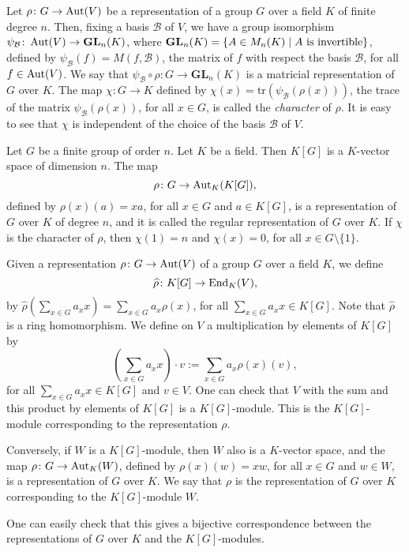 Let $\rho\colon G\rightarrow\operatorname{Aut}(V)$ be a representation of a group $G$ over a field $K$ of finite degree $n$. 
Then, fixing a basis $\mathcal{B}$ of $V$, we have a group isomorphism $\psi_{\mathcal{B}}\colon \operatorname{Aut}(V)\rightarrow \mathbf{GL}_n(K)$, where $\mathbf{GL}_n(K)=\{ A\in M_n(K)\mid A\mbox{ is invertible}\}$, defined by $\psi_{\mathcal{B}}(f)=M(f,\mathcal{B})$, the matrix
of $f$ with respect the basis $\mathcal{B}$, for all $f\in \operatorname{Aut}(V)$. We say that $\psi_{\mathcal{B}}\circ \rho\colon G\rightarrow \mathbf{GL}_n(K)$ is a matricial representation of $G$ over $K$. The map $\chi\colon G\rightarrow K$ defined by 
$\chi(x)=\mathrm{tr}(\psi_{\mathcal{B}}( \rho(x)))$, the trace of the matrix $\psi_{\mathcal{B}}( \rho(x))$, for all $x\in G$, is called 
the {\em character} of $\rho$. It is easy to see that $\chi$ is independent of the choice of the basis $\mathcal{B}$ of $V$.

\begin{example}
Let $G$ be a finite group of order $n$. Let $K$ be a field. Then $K[G]$ is a $K$-vector space of dimension $n$. The map
\[ \rho\colon G\rightarrow \operatorname{Aut}_K(K[G]),\]
defined by $\rho(x)(a)=xa$, for all $x\in G$ and $a\in K[G]$, is a representation of $G$ over $K$ of degree $n$, and it is called the regular representation of $G$ over $K$. If $\chi$ is the character of $\rho$, then $\chi(1)=n$ and $\chi(x)=0$, for all $x\in G\setminus\{ 1\}$. 
\end{example}

Given a representation $\rho\colon G\rightarrow \operatorname{Aut}(V)$ of a group $G$ over a field $K$, we define 
\[\widehat{\rho}\colon K[G]\rightarrow \operatorname{End}_K(V),\]
by $\widehat{\rho}\left(\sum_{x\in G}a_xx\right)=\sum_{x\in G}a_x\rho(x)$, for all $\sum_{x\in G}a_xx\in K[G]$. Note that
$\widehat{\rho}$ is a ring homomorphism. We define on $V$ a multiplication by elements of $K[G]$ by
\[ \left(\sum_{x\in G}a_xx\right)\cdot v:=\sum_{x\in G}a_x\rho(x)(v),\]
for all $\sum_{x\in G}a_xx\in K[G]$ and $v\in V$. One can check that $V$ with the sum and this product by elements of $K[G]$ is a $K[G]$-module. This is the $K[G]$-module corresponding to the representation $\rho$.

Conversely, if $W$ is a $K[G]$-module, then $W$ also is a $K$-vector space, and the map $\rho\colon G\rightarrow\operatorname{Aut}_K(W)$, 
defined by $\rho(x)(w)=xw$, for all $x\in G$ and $w\in W$, is a representation of $G$ over $K$. We say that $\rho$ is the representation of $G$ over $K$ corresponding to the $K[G]$-module $W$.

One can easily check that this gives a bijective correspondence between the representations of $G$ over $K$ and the $K[G]$-modules.

